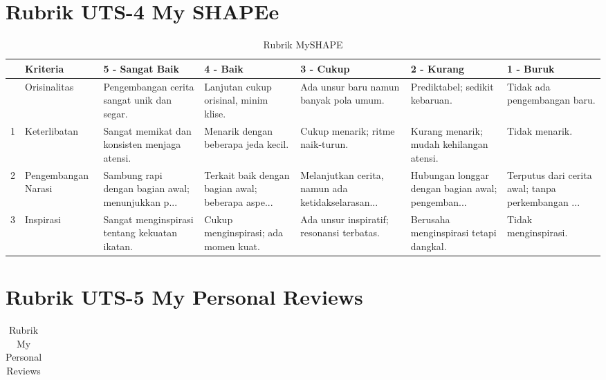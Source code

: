\documentclass[
  letterpaper,
  DIV=11,
  numbers=noendperiod]{scrreprt}
\begin{document}
\begin{landscape}
\begin{longtable}[]{@{}lllllll@{}}
\end{longtable}

\chapter{Rubrik UTS-4 My SHAPEe}\label{rubrik-uts-4-my-shapee}

\begin{longtable}[]{@{}lllllll@{}}

\caption{\label{tbl-rubric_uts-4}Rubrik MySHAPE}

\tabularnewline

\toprule\noalign{}
& Kriteria & 5 - Sangat Baik & 4 - Baik & 3 - Cukup & 2 - Kurang & 1 -
Buruk \\
\midrule\noalign{}
\endhead
\bottomrule\noalign{}
\endlastfoot
0 & Orisinalitas & Pengembangan cerita sangat unik dan segar. & Lanjutan
cukup orisinal, minim klise. & Ada unsur baru namun banyak pola umum. &
Prediktabel; sedikit kebaruan. & Tidak ada pengembangan baru. \\
1 & Keterlibatan & Sangat memikat dan konsisten menjaga atensi. &
Menarik dengan beberapa jeda kecil. & Cukup menarik; ritme naik-turun. &
Kurang menarik; mudah kehilangan atensi. & Tidak menarik. \\
2 & Pengembangan Narasi & Sambung rapi dengan bagian awal; menunjukkan
p... & Terkait baik dengan bagian awal; beberapa aspe... & Melanjutkan
cerita, namun ada ketidakselarasan... & Hubungan longgar dengan bagian
awal; pengemban... & Terputus dari cerita awal; tanpa perkembangan
... \\
3 & Inspirasi & Sangat menginspirasi tentang kekuatan ikatan. & Cukup
menginspirasi; ada momen kuat. & Ada unsur inspiratif; resonansi
terbatas. & Berusaha menginspirasi tetapi dangkal. & Tidak
menginspirasi. \\

\end{longtable}

\chapter{Rubrik UTS-5 My Personal
Reviews}\label{rubrik-uts-5-my-personal-reviews}

\begin{longtable}[]{@{}lllllll@{}}

\caption{\label{tbl-rubric_uts-5}Rubrik My Personal Reviews}

\tabularnewline


\end{longtable}
\end{landscape}
\end{document}
